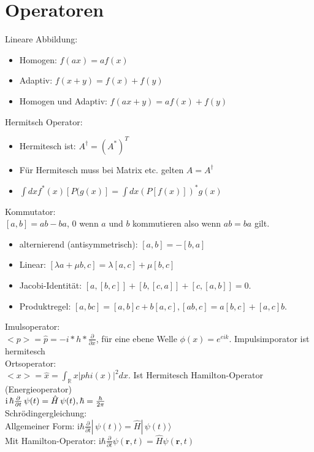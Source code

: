 \documentclass[10pt,a4paper]{article}
\begin{document}
\section{Operatoren}
Lineare Abbildung:
\begin{itemize}
\item Homogen: $f(ax) = af(x) $
\item Adaptiv: $f(x+y)= f(x) + f(y)$
\item Homogen und Adaptiv: $f(ax + y) = af(x) + f(y)$ 
\end{itemize}
%
Hermitsch Operator:
\begin{itemize}
\item Hermitesch ist: $A^{\dagger}  = (A^*)^T$
\item Für Hermitesch muss bei Matrix etc. gelten $ A = A^\dagger$
\item $\int dx f^*(x)[P(g(x)]= \int dx (P[f(x)])^*g(x)$
\end{itemize}
%
Kommutator:\\
$[a,b]=ab-ba$, $0$ wenn $a$ und $b$ kommutieren also wenn $ab=ba$ gilt.
\begin{itemize}
\item  alternierend (antisymmetrisch): $[a,b]=-[b,a]$
\item Linear: $ [\lambda a+\mu b,c]=\lambda [a,c] + \mu [b,c]$
\item Jacobi-Identität: $[a,[b,c]]+[b,[c,a]]+[c,[a,b]]=0.$
\item Produktregel: $[a,bc] = [a,b]c+b[a,c], [ab,c] = a[b,c]+[a,c]b.$
\end{itemize}
%
Imulsoperator:\\
$<p> = \hat p = -i*h*\frac{\partial}{\partial x}$, für eine ebene Welle $\phi(x)=e^{eik}$. Impulsimporator ist hermitesch\\
%
Ortsoperator:\\
$<x> = \hat x =  \int_{\mathbb{R}} x|phi(x)|^2 dx$. Ist Hermitesch
%
Hamilton-Operator (Energieoperator)\\
$\mathrm i \, \hbar {\partial \over \partial t} \, \psi (t) = \hat H \, \psi (t),\hbar = \frac{h}{2\pi}$\\
%
Schrödingergleichung:\\
Allgemeiner Form: $\mathrm{i}\hbar\frac{\partial}{\partial t} |\,\psi (t) \rangle = \hat{H} |\,\psi (t) \rangle$\\
%
Mit Hamilton-Operator: $\mathrm{i}\hbar\frac{\partial}{\partial t} \psi(\mathbf{r},t) = \hat H \psi(\mathbf{r},t)$
\end{document}
